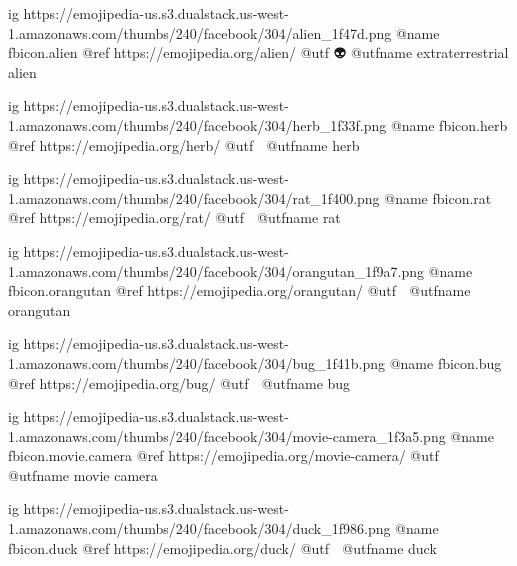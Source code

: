 	ig https://emojipedia-us.s3.dualstack.us-west-1.amazonaws.com/thumbs/240/facebook/304/alien_1f47d.png
	@name fbicon.alien
	@ref https://emojipedia.org/alien/
	@utf 👽
	@utfname extraterrestrial alien

	ig https://emojipedia-us.s3.dualstack.us-west-1.amazonaws.com/thumbs/240/facebook/304/herb_1f33f.png
	@name fbicon.herb
	@ref https://emojipedia.org/herb/
	@utf 🌿
	@utfname herb

	ig https://emojipedia-us.s3.dualstack.us-west-1.amazonaws.com/thumbs/240/facebook/304/rat_1f400.png
	@name fbicon.rat
	@ref https://emojipedia.org/rat/
	@utf 🐀
	@utfname rat

	ig https://emojipedia-us.s3.dualstack.us-west-1.amazonaws.com/thumbs/240/facebook/304/orangutan_1f9a7.png
	@name fbicon.orangutan
	@ref https://emojipedia.org/orangutan/
	@utf 🦧
	@utfname orangutan

	ig https://emojipedia-us.s3.dualstack.us-west-1.amazonaws.com/thumbs/240/facebook/304/bug_1f41b.png
	@name fbicon.bug
	@ref https://emojipedia.org/bug/
	@utf 🐛
	@utfname bug

	ig https://emojipedia-us.s3.dualstack.us-west-1.amazonaws.com/thumbs/240/facebook/304/movie-camera_1f3a5.png
	@name fbicon.movie.camera
	@ref https://emojipedia.org/movie-camera/
	@utf 🎥
	@utfname movie camera

	ig https://emojipedia-us.s3.dualstack.us-west-1.amazonaws.com/thumbs/240/facebook/304/duck_1f986.png
	@name fbicon.duck
	@ref https://emojipedia.org/duck/
	@utf 🦆
	@utfname duck



\fi

